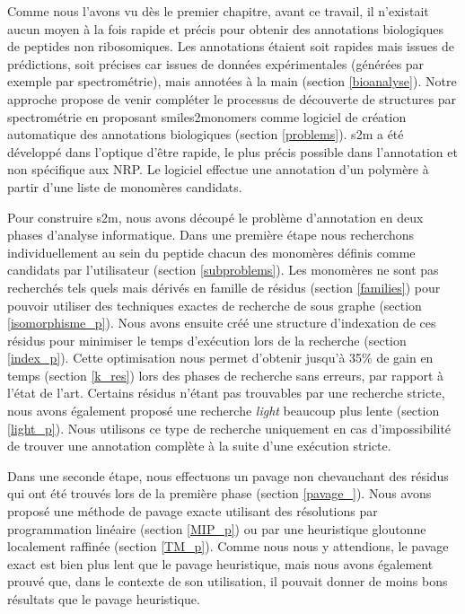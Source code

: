 Comme nous l'avons vu dès le premier chapitre, avant ce travail, il n'existait aucun moyen à la fois rapide et précis pour obtenir des annotations biologiques de peptides non ribosomiques.
Les annotations étaient soit rapides mais issues de prédictions, soit précises car issues de données expérimentales (générées par exemple par spectrométrie), mais annotées à la main (section \ref{bioanalyse}).
Notre approche propose de venir compléter le processus de découverte de structures par spectrométrie en proposant smiles2monomers comme logiciel de création automatique des annotations biologiques (section \ref{problems}).
s2m a été développé dans l'optique d'être rapide, le plus précis possible dans l'annotation et non spécifique aux NRP.
Le logiciel effectue une annotation d'un polymère à partir d'une liste de monomères candidats.

Pour construire s2m, nous avons découpé le problème d'annotation en deux phases d'analyse informatique.
Dans une première étape nous recherchons individuellement au sein du peptide chacun des monomères définis comme candidats par l'utilisateur (section \ref{subproblems}).
Les monomères ne sont pas recherchés tels quels mais dérivés en famille de résidus (section \ref{families}) pour pouvoir utiliser des techniques exactes de recherche de sous graphe (section \ref{isomorphisme_p}).
Nous avons ensuite créé une structure d'indexation de ces résidus pour minimiser le temps d'exécution lors de la recherche (section \ref{index_p}).
Cette optimisation nous permet d'obtenir jusqu'à 35\% de gain en temps (section \ref{k_res}) lors des phases de recherche sans erreurs, par rapport à l'état de l'art.
Certains résidus n'étant pas trouvables par une recherche stricte, nous avons également proposé une recherche \textit{light} beaucoup plus lente (section \ref{light_p}). Nous utilisons ce type de recherche uniquement en cas d'impossibilité de trouver une annotation complète à la suite d'une exécution stricte.

Dans une seconde étape, nous effectuons un pavage non chevauchant des résidus qui ont été trouvés lors de la première phase (section \ref{pavage_}).
Nous avons proposé une méthode de pavage exacte utilisant des résolutions par programmation linéaire (section \ref{MIP_p}) ou par une heuristique gloutonne localement raffinée (section \ref{TM_p}).
Comme nous nous y attendions, le pavage exact est bien plus lent que le pavage heuristique, mais nous avons également prouvé que, dans le contexte de son utilisation, il pouvait donner de moins bons résultats que le pavage heuristique.

